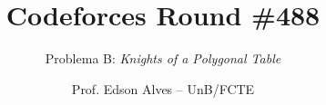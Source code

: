 \title{Codeforces Round \#488}
\subtitle{Problema B: \textit{Knights of a Polygonal Table}}
\author{Prof. Edson Alves -- UnB/FCTE}
\date{}
